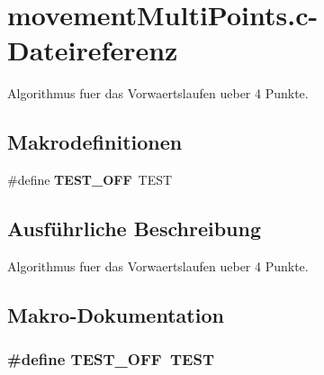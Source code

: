 \section{movementMultiPoints.c-\/Dateireferenz}
\label{movement_multi_points_8c}


Algorithmus fuer das Vorwaertslaufen ueber 4 Punkte.  


\subsection*{Makrodefinitionen}
\begin{DoxyCompactItemize}
\item 
\#define {\bf TEST\_\-OFF}~TEST
\end{DoxyCompactItemize}


\subsection{Ausführliche Beschreibung}
Algorithmus fuer das Vorwaertslaufen ueber 4 Punkte. 

\subsection{Makro-\/Dokumentation}
\subsubsection[{TEST\_\-OFF}]{\setlength{\rightskip}{0pt plus 5cm}\#define TEST\_\-OFF~TEST}\label{movement_multi_points_8c_a8f6764e8e57eabbb14922404c0e25175}

